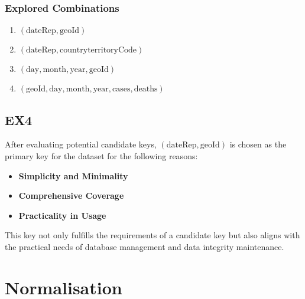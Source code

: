 \documentclass{article}
\begin{document}
\subsubsection{Explored Combinations}
\begin{enumerate}
    \item \( (\text{dateRep}, \text{geoId}) \)
    
    
    \item \( (\text{dateRep}, \text{countryterritoryCode}) \)
   
    \item \( (\text{day}, \text{month}, \text{year}, \text{geoId}) \)
   
    
    \item \( (\text{geoId}, \text{day}, \text{month}, \text{year}, \text{cases}, \text{deaths}) \)
\end{enumerate}

\subsection{EX4}

After evaluating potential candidate keys, \textbf{\( (\text{dateRep}, \text{geoId}) \)} is chosen as the primary key for the dataset for the following reasons:

\begin{itemize}
    \item \textbf{Simplicity and Minimality} 
    \item \textbf{Comprehensive Coverage}
    \item \textbf{Practicality in Usage}
\end{itemize}

This key not only fulfills the requirements of a candidate key but also aligns with the practical needs of database management and data integrity maintenance.

\section{Normalisation}
\end{document}
